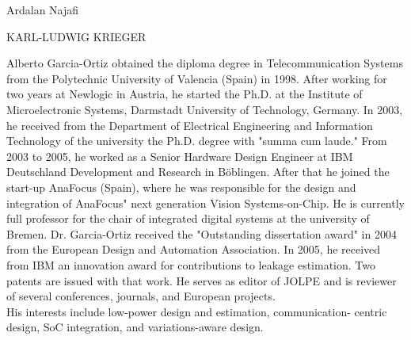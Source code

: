 \begin{IEEEbiography}{Ardalan Najafi}
\end{IEEEbiography}

\begin{IEEEbiography}{KARL-LUDWIG KRIEGER}
\end{IEEEbiography}

\begin{IEEEbiography}{Alberto Garcia-Ortiz}
    obtained the diploma degree in
    Telecommunication Systems from the Polytechnic University of
    Valencia (Spain) in 1998. After working for two years at Newlogic
    in Austria, he started the Ph.D. at the Institute of
    Microelectronic Systems, Darmstadt University of Technology,
    Germany. In 2003, he received from the Department of Electrical
    Engineering and Information Technology of the university the
    Ph.D. degree with "summa cum laude." From 2003 to 2005, he worked
    as a Senior Hardware Design Engineer at IBM Deutschland
    Development and Research in B{\"o}blingen.  After that he joined the
    start-up AnaFocus (Spain), where he was responsible for the design
    and integration of AnaFocus" next generation Vision
    Systems-on-Chip. He is currently full professor for the chair of
    integrated digital systems at the university of Bremen.
    Dr. Garcia-Ortiz received the "Outstanding dissertation award" in
    2004 from the European Design and Automation Association. In 2005,
    he received from IBM an innovation award for contributions to
    leakage estimation. Two patents are issued with that work. He
    serves as editor of JOLPE and is reviewer of several conferences,
    journals, and European projects. \\
    His interests include low-power
    design and estimation, communication- centric design, SoC
    integration, and variations-aware design. 
\end{IEEEbiography}
